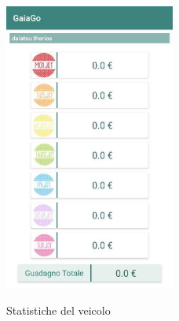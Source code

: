 \begin{figure}[H] 
	\centering 
	\includegraphics[width=0.5\textwidth]{res/images/statistiche_veicolo.jpg}\\
	\caption{Statistiche del veicolo}
	\label{statisticheveicolo}
\end{figure}
\pagebreak

